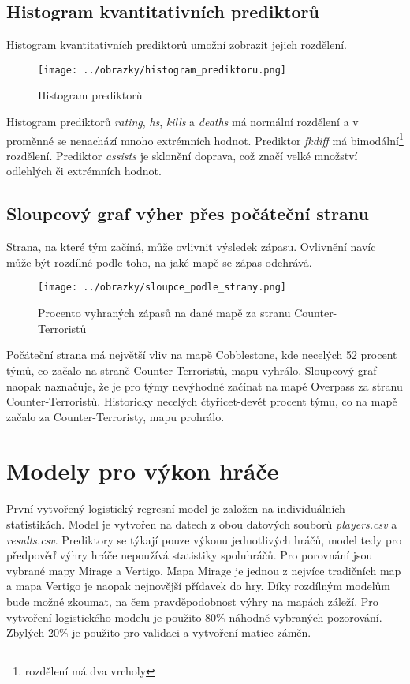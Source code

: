 \newpage
\subsection{Histogram kvantitativních prediktorů}
Histogram kvantitativních prediktorů umožní zobrazit jejich rozdělení.

\begin{figure}[H]
    \centering
    \texttt{[image: ../obrazky/histogram\_prediktoru.png]}
    \caption{Histogram prediktorů} 
    \label{fig:histogram_prediktoru}
\end{figure}

Histogram prediktorů \textit{rating}, \textit{hs}, \textit{kills} a \textit{deaths} má normální rozdělení a v proměnné se nenachází mnoho extrémních hodnot.
Prediktor \textit{fkdiff} má bimodální\footnote{rozdělení má dva vrcholy} rozdělení. Prediktor \textit{assists} je sklonění doprava, což značí velké množství 
odlehlých či extrémních hodnot.

\newpage
\subsection{Sloupcový graf výher přes počáteční stranu}
Strana, na které tým začíná, může ovlivnit výsledek zápasu. Ovlivnění navíc může být rozdílné podle toho, na jaké mapě se zápas odehrává.

\begin{figure}[H]
    \centering
    \texttt{[image: ../obrazky/sloupce\_podle\_strany.png]}
    \caption{Procento vyhraných zápasů na dané mapě za stranu Counter-Terroristů} 
    \label{fig:sloupcovy_graf_strany}
\end{figure}

Počáteční strana má největší vliv na mapě Cobblestone, kde necelých 52 procent týmů, co začalo na straně Counter-Terroristů, mapu vyhrálo. Sloupcový graf naopak naznačuje, že 
je pro týmy nevýhodné začínat na mapě Overpass za stranu Counter-Terroristů. Historicky necelých čtyřicet-devět procent týmu, co na mapě začalo za Counter-Terroristy, mapu prohrálo.

\section{Modely pro výkon hráče}
První vytvořený logistický regresní model je založen na individuálních statistikách. Model je vytvořen na datech z obou datových souborů \textit{players.csv} a \textit{results.csv}.
Prediktory se týkají pouze výkonu jednotlivých hráčů, model tedy pro předpověď výhry hráče nepoužívá statistiky spoluhráčů. Pro porovnání jsou vybrané mapy Mirage a Vertigo.
Mapa Mirage je jednou z nejvíce tradičních map a mapa Vertigo je naopak nejnovější přídavek do hry. Díky rozdílným modelům bude možné zkoumat, na čem pravděpodobnost výhry na 
mapách záleží. Pro vytvoření logistického modelu je použito 80\% náhodně vybraných pozorování. Zbylých 20\% je použito pro validaci a vytvoření matice záměn.

